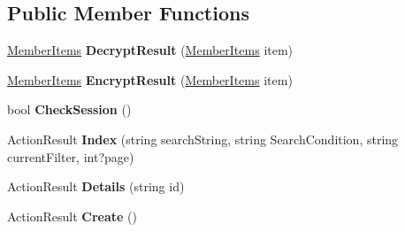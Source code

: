 \subsection*{Public Member Functions}
\begin{DoxyCompactItemize}
\item 
\hyperlink{class_cloud_bread_admin_web_1_1_member_items}{Member\+Items} {\bfseries Decrypt\+Result} (\hyperlink{class_cloud_bread_admin_web_1_1_member_items}{Member\+Items} item)\hypertarget{class_cloud_bread_admin_web_1_1_controllers_1_1_member_items_controller_abeaf758cc68ebc9b836746c043cd5ddc}{}\label{class_cloud_bread_admin_web_1_1_controllers_1_1_member_items_controller_abeaf758cc68ebc9b836746c043cd5ddc}

\item 
\hyperlink{class_cloud_bread_admin_web_1_1_member_items}{Member\+Items} {\bfseries Encrypt\+Result} (\hyperlink{class_cloud_bread_admin_web_1_1_member_items}{Member\+Items} item)\hypertarget{class_cloud_bread_admin_web_1_1_controllers_1_1_member_items_controller_a71fe95f0a6170cd31971802a6cacef29}{}\label{class_cloud_bread_admin_web_1_1_controllers_1_1_member_items_controller_a71fe95f0a6170cd31971802a6cacef29}

\item 
bool {\bfseries Check\+Session} ()\hypertarget{class_cloud_bread_admin_web_1_1_controllers_1_1_member_items_controller_a81ca0b39de918ed1582be13bc2dd8af0}{}\label{class_cloud_bread_admin_web_1_1_controllers_1_1_member_items_controller_a81ca0b39de918ed1582be13bc2dd8af0}

\item 
Action\+Result {\bfseries Index} (string search\+String, string Search\+Condition, string current\+Filter, int?page)\hypertarget{class_cloud_bread_admin_web_1_1_controllers_1_1_member_items_controller_aed4ecc177fdbd0c82c93914b091dc6e4}{}\label{class_cloud_bread_admin_web_1_1_controllers_1_1_member_items_controller_aed4ecc177fdbd0c82c93914b091dc6e4}

\item 
Action\+Result {\bfseries Details} (string id)\hypertarget{class_cloud_bread_admin_web_1_1_controllers_1_1_member_items_controller_aea46203423afddd2bc94ea5d85773463}{}\label{class_cloud_bread_admin_web_1_1_controllers_1_1_member_items_controller_aea46203423afddd2bc94ea5d85773463}

\item 
Action\+Result {\bfseries Create} ()\hypertarget{class_cloud_bread_admin_web_1_1_controllers_1_1_member_items_controller_acd9b22be4fd94618a1013d9cec9b536d}{}\label{class_cloud_bread_admin_web_1_1_controllers_1_1_member_items_controller_acd9b22be4fd94618a1013d9cec9b536d}


\end{DoxyCompactItemize}
